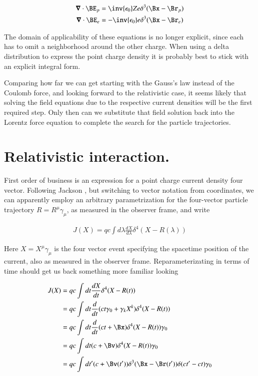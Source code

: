 \begin{align}\label{eqn:nuclearInteraction:boo6}
\spacegrad \cdot \BE_p &= \inv{\epsilon_0} Z e \delta^3(\Bx - \Br_p) \\
\spacegrad \cdot \BE_e &= -\inv{\epsilon_0} e \delta^3(\Bx - \Br_e) 
\end{align}

The domain of applicability of these equations is no longer explicit, since each has to omit a neighborhood around the other charge.  When using a delta distribution to express the point charge density it is probably best to stick with an explicit integral form.

Comparing how far we can get starting with the Gauss's law instead of the Coulomb force, and looking forward to the relativistic case, it seems likely that solving the field equations due to the respective current densities will be the first required step.  Only then can we substitute that field solution back into the Lorentz force equation to complete the search for the particle trajectories.

\section{Relativistic interaction.}

First order of business is an expression for a point charge current density four vector.  Following Jackson \cite{jackson1975cew}, but switching to vector notation from coordinates, we can apparently employ an arbitrary parametrization for the four-vector particle trajectory $R = R^\mu \gamma_\mu$, as measured in the observer frame, and write

\begin{align}\label{eqn:nuclearInteraction:boo7}
J(X) = q c \int d\lambda \frac{dX}{d\lambda} \delta^4 (X - R(\lambda))
\end{align}

Here $X = X^\mu \gamma_\mu$ is the four vector event specifying the spacetime position of the current, also as measured in the observer frame.  Reparameterizating in terms of time should get us back something more familiar looking

\begin{align*}
J(X) 
&= q c \int dt \frac{dX}{dt} \delta^4 (X - R(t)) \\
&= q c \int dt \frac{d}{dt} (c t \gamma_0 + \gamma_k X^k)\delta^4 (X - R(t)) \\
&= q c \int dt \frac{d}{dt} (c t + \Bx)\delta^4 (X - R(t)) \gamma_0 \\
&= q c \int dt (c + \Bv)\delta^4 (X - R(t)) \gamma_0 \\
&= q c \int dt' (c + \Bv(t'))\delta^3 (\Bx - \Br(t')) \delta(c t' - c t) \gamma_0 \\
\end{align*}

